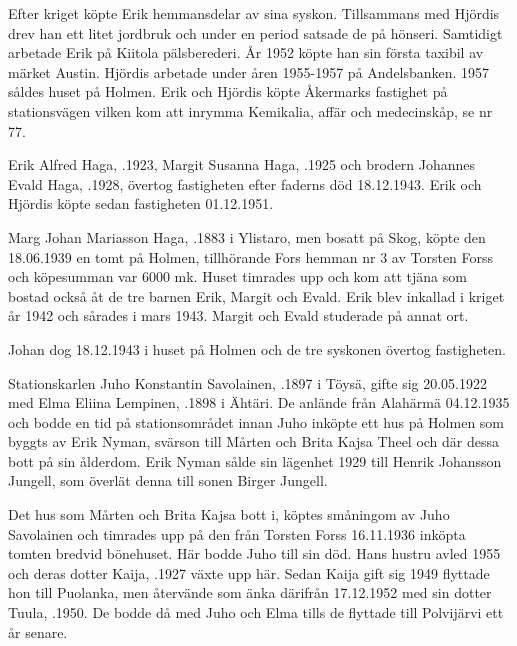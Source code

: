 Efter kriget köpte Erik hemmansdelar av sina syskon. Tillsammans med Hjördis drev han ett litet jordbruk och under en period satsade de på  hönseri. Samtidigt arbetade Erik på Kiitola pälsberederi. År 1952 köpte han sin första taxibil av märket Austin. Hjördis arbetade under åren 1955-1957 på Andelsbanken. 1957 såldes huset på Holmen. Erik och Hjördis köpte Åkermarks fastighet på stationsvägen vilken kom att inrymma Kemikalia, affär och medecinskåp, se nr 77.
\begin{jhchildren}
  \item {}
  \item {}
  \item {}
  \item {}
\end{jhchildren}


Erik Alfred Haga, .1923,  Margit Susanna Haga, .1925 och brodern Johannes Evald Haga, .1928, övertog fastigheten efter faderns död 18.12.1943. Erik och Hjördis köpte sedan fastigheten 01.12.1951.


Marg
Johan Mariasson Haga, .1883 i Ylistaro, men bosatt på Skog, köpte den 18.06.1939 en tomt på Holmen, tillhörande Fors hemman nr 3 av Torsten Forss och köpesumman var 6000 mk. Huset timrades upp och kom att tjäna som bostad också åt de tre barnen Erik, Margit och Evald. Erik blev inkallad i kriget år 1942 och sårades i mars 1943. Margit och Evald studerade på annat ort.

Johan dog 18.12.1943 i huset på Holmen och de tre syskonen övertog fastigheten.




Stationskarlen Juho Konstantin Savolainen, .1897 i Töysä, gifte sig 20.05.1922 med Elma Eliina Lempinen, .1898 i Ähtäri. De anlände från Alahärmä 04.12.1935 och bodde en tid på stationsområdet innan Juho inköpte ett hus på Holmen som byggts av Erik Nyman, svärson till Mårten och Brita Kajsa Theel och där dessa bott på sin ålderdom. Erik Nyman sålde sin lägenhet 1929 till Henrik Johansson Jungell, som överlät denna till sonen Birger Jungell.

Det hus som Mårten och Brita Kajsa bott i, köptes småningom av Juho Savolainen och timrades upp på den från Torsten Forss 16.11.1936 inköpta tomten bredvid bönehuset. Här bodde Juho till sin död. Hans hustru avled 1955 och deras dotter Kaija, .1927 växte upp här. Sedan Kaija gift sig 1949 flyttade hon till Puolanka, men återvände som änka därifrån 17.12.1952 med sin dotter Tuula, .1950. De bodde då med Juho och Elma tills de flyttade till Polvijärvi ett år senare.

